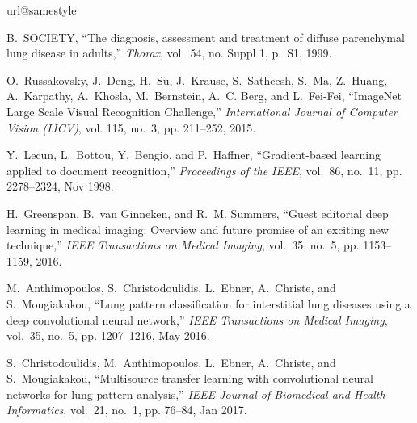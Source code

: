 \documentclass[journal]{IEEEtran}
\begin{document}
\providecommand{\url}[1]{#1}
\csname url@samestyle\endcsname
\providecommand{\newblock}{\relax}
\providecommand{\bibinfo}[2]{#2}
\providecommand{\BIBentrySTDinterwordspacing}{\spaceskip=0pt\relax}
\providecommand{\BIBentryALTinterwordstretchfactor}{4}
\providecommand{\BIBentryALTinterwordspacing}{\spaceskip=\fontdimen2\font plus
\BIBentryALTinterwordstretchfactor\fontdimen3\font minus
  \fontdimen4\font\relax}
\providecommand{\BIBforeignlanguage}[2]{{%
\expandafter\ifx\csname l@#1\endcsname\relax
\typeout{** WARNING: IEEEtran.bst: No hyphenation pattern has been}%
\typeout{** loaded for the language `#1'. Using the pattern for}%
\typeout{** the default language instead.}%
\else
\language=\csname l@#1\endcsname
\fi
#2}}
\providecommand{\BIBdecl}{\relax}
\BIBdecl

B.~SOCIETY, ``The diagnosis, assessment and treatment of diffuse parenchymal
  lung disease in adults,'' \emph{Thorax}, vol.~54, no. Suppl 1, p.~S1, 1999.

O.~Russakovsky, J.~Deng, H.~Su, J.~Krause, S.~Satheesh, S.~Ma, Z.~Huang,
  A.~Karpathy, A.~Khosla, M.~Bernstein, A.~C. Berg, and L.~Fei-Fei, ``{ImageNet
  Large Scale Visual Recognition Challenge},'' \emph{International Journal of
  Computer Vision (IJCV)}, vol. 115, no.~3, pp. 211--252, 2015.

Y.~Lecun, L.~Bottou, Y.~Bengio, and P.~Haffner, ``Gradient-based learning
  applied to document recognition,'' \emph{Proceedings of the IEEE}, vol.~86,
  no.~11, pp. 2278--2324, Nov 1998.

H.~Greenspan, B.~van Ginneken, and R.~M. Summers, ``Guest editorial deep
  learning in medical imaging: Overview and future promise of an exciting new
  technique,'' \emph{IEEE Transactions on Medical Imaging}, vol.~35, no.~5, pp.
  1153--1159, 2016.

M.~Anthimopoulos, S.~Christodoulidis, L.~Ebner, A.~Christe, and S.~Mougiakakou,
  ``Lung pattern classification for interstitial lung diseases using a deep
  convolutional neural network,'' \emph{IEEE Transactions on Medical Imaging},
  vol.~35, no.~5, pp. 1207--1216, May 2016.

S.~Christodoulidis, M.~Anthimopoulos, L.~Ebner, A.~Christe, and S.~Mougiakakou,
  ``Multisource transfer learning with convolutional neural networks for lung
  pattern analysis,'' \emph{IEEE Journal of Biomedical and Health Informatics},
  vol.~21, no.~1, pp. 76--84, Jan 2017.
\end{document}
